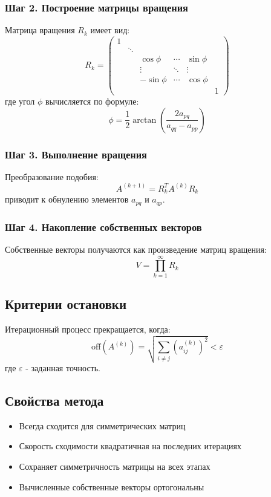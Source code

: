 \subsubsection*{Шаг 2. Построение матрицы вращения}
Матрица вращения $R_k$ имеет вид:
\begin{equation}
R_k = \begin{pmatrix}
1 & & & & \\
& \ddots & & & \\
& & \cos\phi & \cdots & \sin\phi \\
& & \vdots & \ddots & \vdots \\
& & -\sin\phi & \cdots & \cos\phi \\
& & & & & 1
\end{pmatrix}
\end{equation}
где угол $\phi$ вычисляется по формуле:
\begin{equation}
\phi = \frac{1}{2}\arctan\left(\frac{2a_{pq}}{a_{qq}-a_{pp}}\right)
\end{equation}

\subsubsection*{Шаг 3. Выполнение вращения}
Преобразование подобия:
\begin{equation}
A^{(k+1)} = R_k^T A^{(k)} R_k
\end{equation}
приводит к обнулению элементов $a_{pq}$ и $a_{qp}$.

\subsubsection*{Шаг 4. Накопление собственных векторов}
Собственные векторы получаются как произведение матриц вращения:
\begin{equation}
V = \prod_{k=1}^{\infty} R_k
\end{equation}

\subsection*{Критерии остановки}
Итерационный процесс прекращается, когда:
\begin{equation}
\mathrm{off}(A^{(k)}) = \sqrt{\sum_{i \neq j} (a_{ij}^{(k)})^2} < \varepsilon
\end{equation}
где $\varepsilon$ - заданная точность.

\subsection*{Свойства метода}
\begin{itemize}
\item Всегда сходится для симметрических матриц
\item Скорость сходимости квадратичная на последних итерациях
\item Сохраняет симметричность матрицы на всех этапах
\item Вычисленные собственные векторы ортогональны
\end{itemize}

